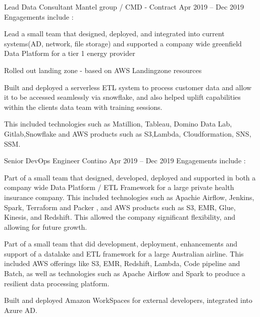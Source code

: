 \begin{cventries}
  \cventryextended
  {Lead Data Consultant} %
  {Mantel group / CMD - Contract} %
  {} %
  {Apr 2019 – Dec 2019} %
  {Engagements include :} %
  {
    \begin{cvitems} %
      \item{Lead a small team that designed, deployed, and integrated into
                  current
                  systems(AD, network, file storage) and supported a company
                  wide greenfield Data
                  Platform for a tier 1
                  energy provider}
      \item{Rolled out landing zone - based on AWS Landingzone
                  resources }
      \item {Built and deployed a serverless ETL system to process customer
                  data and allow it to be accessed seamlessly via snowflake,
                  and also
                  helped uplift capabilities within the clients data team with
                  training
                  sessions.}
      \item {This included technologies such as Matillion, Tableau, Domino Data
                  Lab,
                  Gitlab,Snowflake and AWS products such as S3,Lambda,
                  Cloudformation, SNS,
                  SSM.}
    \end{cvitems}
  }

  \cventryextended
  {Senior DevOps Engineer} %
  {Contino} %
  {} %
  {Apr 2019 – Dec 2019} %
  {Engagements include :} %
  {
    \begin{cvitems} %
      \item{Part of a small team that designed, developed, deployed and
                  supported in both a company wide Data Platform / ETL
                  Framework for a large
                  private health insurance company. This included technologies
                  such as Apachie
                  Airflow, Jenkins, Spark,  Terraform and Packer , and AWS
                  products such as S3,
                  EMR, Glue, Kinesis, and Redshift. This allowed the company
                  significant
                  flexibility, and allowing for future growth.}
      \item {Part of a small team that did development, deployment,
                  enhancements and support of a datalake and ETL framework for
                  a large Australian
                  airline. This included AWS offerings like S3, EMR, Redshift,
                  Lambda, Code
                  pipeline and Batch, as well as technologies such as Apache
                  Airflow and Spark to
                  produce a resilient data processing platform. }
      \item {Built and deployed Amazon WorkSpaces for external developers,
                  integrated into Azure AD.}
    \end{cvitems}
  }


\end{cventries}
